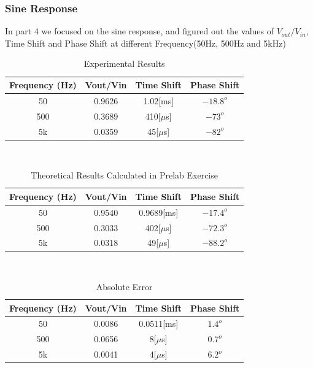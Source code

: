 \documentclass[12pt]{article}
\begin{document}
\subsubsection{Sine Response}
In part 4 we focused on the sine response, and figured out the values of $V_{out}/V_{in}$, Time Shift and Phase Shift at different Frequency(50Hz, 500Hz and 5kHz)
\begin{table}[H]
\centering
\begin{tabular}{|c|c|c|c|}
\hline
Frequency (Hz) & Vout/Vin & Time Shift & Phase Shift \\ \hline
50             &0.9626          &1.02[ms]            &$-18.8^o$             \\ \hline
500            &0.3689          &410[$\mu$s]            & $-73^o$            \\ \hline
5k             &0.0359          &45[$\mu$s]            & $-82^o$            \\ \hline
\end{tabular}
\caption{Experimental Results}
\end{table}
\qquad \\
\begin{table}[H]
\centering
\begin{tabular}{|c|c|c|c|}
\hline
Frequency (Hz) & Vout/Vin & Time Shift & Phase Shift \\ \hline
50             &0.9540          &0.9689[ms]            &$-17.4^o$             \\ \hline
500            &0.3033          &402[$\mu$s]            & $-72.3^o$            \\ \hline
5k             &0.0318          &49[$\mu$s]            & $-88.2^o$            \\ \hline
\end{tabular}
\caption{Theoretical Results Calculated in Prelab Exercise}
\end{table}
\qquad \\
\begin{table}[H]
\centering
\begin{tabular}{|c|c|c|c|}
\hline
Frequency (Hz) & Vout/Vin & Time Shift & Phase Shift \\ \hline
50             &0.0086          &0.0511[ms]            &$1.4^o$             \\ \hline
500            &0.0656          &8[$\mu$s]            & $0.7^o$            \\ \hline
5k             &0.0041          &4[$\mu$s]            & $6.2^o$            \\ \hline
\end{tabular}
\caption{Absolute Error}
\end{table}
\end{document}
